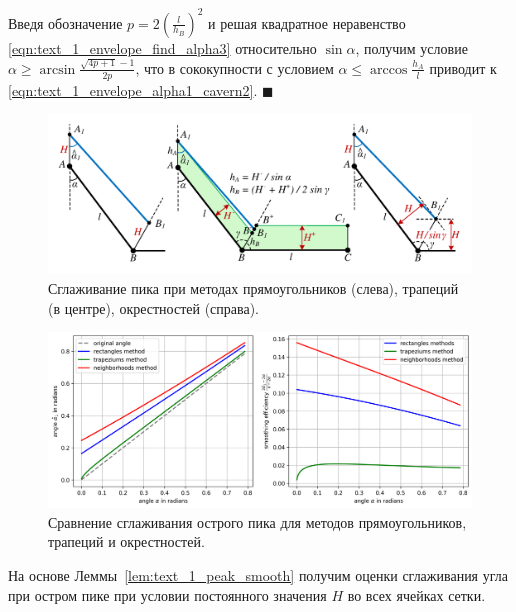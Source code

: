 \documentclass[
11pt,%
tightenlines,%
twoside,%
onecolumn,%
nofloats,%
nobibnotes,%
nofootinbib,%
superscriptaddress,%
noshowpacs,%
centertags]%
{revtex4}
\begin{document}
Введя обозначение $p = 2 \left( \frac{l}{h_B} \right)^2$ и решая квадратное неравенство \eqref{eqn:text_1_envelope_find_alpha3} относительно $\sin \alpha$, получим условие $\alpha \ge \arcsin \frac{\sqrt{4p + 1} - 1}{2p}$, что в сококупности с условием $\alpha \le \arccos \frac{h_A}{l}$ приводит к \eqref{eqn:text_1_envelope_alpha1_cavern2}.
$\blacksquare$\\

\begin{figure}[ht]
\setcaptionmargin{5mm}
\onelinecaptionsfalse %
\includegraphics[width=1.0\textwidth]{./pics/peak-methods.pdf}
\caption{Сглаживание пика при методах прямоугольников (слева), трапеций (в центре), окрестностей (справа).}
\label{fig:text_1_remesh_2d_peak_methods}
\end{figure}

\begin{figure}[ht]
\setcaptionmargin{5mm}
\onelinecaptionstrue  %
\includegraphics[width=1.0\textwidth]{./pics/peak-methods-chart.png}
\caption{Сравнение сглаживания острого пика для методов прямоугольников, трапеций и окрестностей.}
\label{fig:text_1_remesh_2d_peak_methods_chart}
\end{figure}

На основе Леммы~\ref{lem:text_1_peak_smooth} получим оценки сглаживания угла при остром пике при условии постоянного значения $H$ во всех ячейках сетки.
\end{document}
